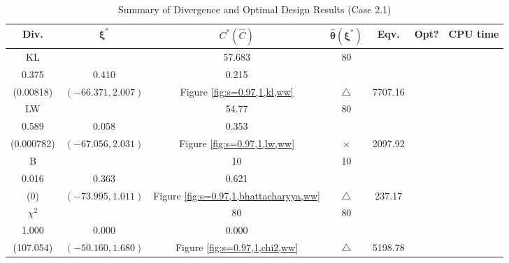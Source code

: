 \documentclass[12pt, a4paper]{article}
\begin{document}
\begin{table}[H]
\centering
\renewcommand{\arraystretch}{1.5} %
\setlength{\tabcolsep}{8pt} %
\begin{tabular}{|c|c|c|c|c|c|c|}
\hline
\textbf{Div.} & \(\boldsymbol{\xi^*}\) & \(C^* (\hat{C})\) & \(\boldsymbol{\hat{\theta}(\xi^*)}\) & \textbf{Eqv.} & \textbf{Opt?} & \textbf{CPU time} \\
\hline
KL & \(\left\{\begin{array}{ccc}
32.416 & 57.683 & 80 \\
0.375 & 0.410 & 0.215
\end{array}\right\}\) &
\(\begin{array}{c}
0.00855 \\
(0.00818)
\end{array}\) & 
\((-66.371, 2.007)\) & 
Figure \ref{fig:s=0.97,1,kl,ww} & $\triangle$ & 7707.16 \\
\hline
LW & \(\left\{\begin{array}{ccc}
31.393 & 54.77 & 80 \\
0.589 & 0.058 & 0.353
\end{array}\right\}\) &
\(\begin{array}{c}
0.00836 \\
(0.000782)
\end{array}\) & 
\((-67.056, 2.031)\) & 
Figure \ref{fig:s=0.97,1,lw,ww} & $\times$ & 2097.92 \\
\hline
B & \(\left\{\begin{array}{ccc}
10 & 10 & 10 \\
0.016 & 0.363 & 0.621
\end{array}\right\}\) &
\(\begin{array}{c}
1.000 \\
(0)
\end{array}\) & 
\((-73.995, 1.011)\) & 
Figure \ref{fig:s=0.97,1,bhattacharyya,ww} & $\triangle$ & 237.17 \\
\hline
\(\chi^2\) & \(\left\{\begin{array}{ccc}
73.505 & 80 & 80 \\
1.000 & 0.000 & 0.000
\end{array}\right\}\) &
\(\begin{array}{c}
144.174 \\
(107.054)
\end{array}\) & 
\((-50.160, 1.680)\) & 
Figure \ref{fig:s=0.97,1,chi2,ww} & $\triangle$ & 5198.78 \\
\hline
\end{tabular}
\caption{Summary of Divergence and Optimal Design Results (Case 2.1)}
\label{tab:results2.1}
\end{table}
\end{document}
